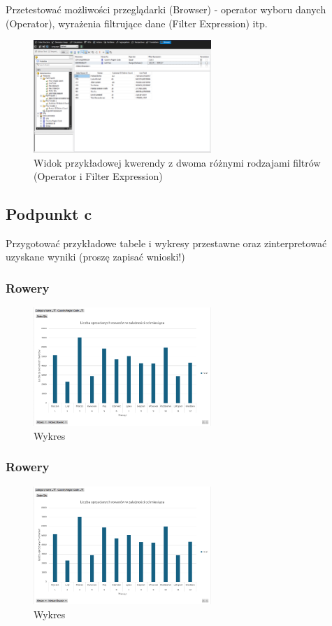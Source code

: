 \documentclass[a4paper,12pt]{article}
\begin{document}
Przetestować możliwości przeglądarki (Browser) - operator wyboru danych (Operator), wyrażenia filtrujące dane (Filter Expression) itp.

\begin{figure}[H]
  \includegraphics[width=0.6\textwidth]{images/2b.png}
  \caption{Widok przykładowej kwerendy z dwoma różnymi rodzajami filtrów (Operator i Filter Expression)}
\end{figure}

\subsection{Podpunkt c}

Przygotować przykładowe tabele i wykresy przestawne oraz zinterpretować uzyskane
wyniki (proszę zapisać wnioski!)

\subsubsection{Rowery}

\begin{figure}[H]
  \includegraphics[width=0.6\textwidth]{images/bike_sales.png}
  \caption{Wykres}
\end{figure}

\subsubsection{Rowery}

\begin{figure}[H]
  \includegraphics[width=0.6\textwidth]{images/bike_sales.png}
  \caption{Wykres}
\end{figure}
\end{document}
